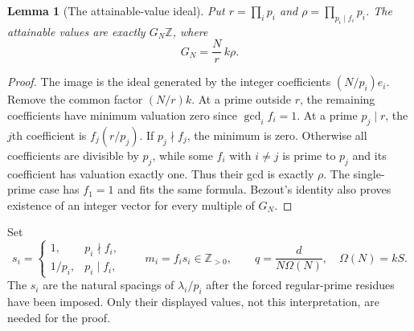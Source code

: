\documentclass[11pt]{article}
\newtheorem{lemma}[theorem]{Lemma}
\theoremstyle{definition}\newtheorem{definition}[theorem]{Definition}
\theoremstyle{remark}\newtheorem{remark}[theorem]{Remark}
\newcommand{\Z}{\mathbb Z}\newcommand{\N}{\mathbb N}\newcommand{\R}{\mathbb R}
\begin{document}
\begin{lemma}[The attainable-value ideal]\label{lem:ideal}
Put $r=\prod_i p_i$ and $\rho=\prod_{p_i\mid f_i}p_i$. The attainable
values are exactly $G_N\Z$, where
\[
G_N=\frac Nr\,k\rho.
\]
\end{lemma}
\begin{proof}
The image is the ideal generated by the integer coefficients
$(N/p_i)e_i$. Remove the common factor $(N/r)k$. At a prime outside $r$, the
remaining coefficients have minimum valuation zero since $\gcd_i f_i=1$.
At a prime $p_j\mid r$, the $j$th coefficient is $f_j(r/p_j)$. If
$p_j\nmid f_j$, the minimum is zero. Otherwise all coefficients are
divisible by $p_j$, while some $f_i$ with $i\ne j$ is prime to $p_j$ and its
coefficient has valuation exactly one. Thus their gcd is exactly $\rho$.
The single-prime case has $f_1=1$ and fits the same formula. Bezout's identity
also proves existence of an integer vector for every multiple of $G_N$.
\end{proof}

Set
\[
s_i=\begin{cases}1,&p_i\nmid f_i,\\1/p_i,&p_i\mid f_i,\end{cases}
\qquad m_i=f_i s_i\in\Z_{>0},\qquad q=\frac{d}{N\Omega(N)},
\quad\Omega(N)=kS.
\]
The $s_i$ are the natural spacings of $\lambda_i/p_i$ after the forced
regular-prime residues have been imposed. Only their displayed values,
not this interpretation, are needed for the proof.
\end{document}
